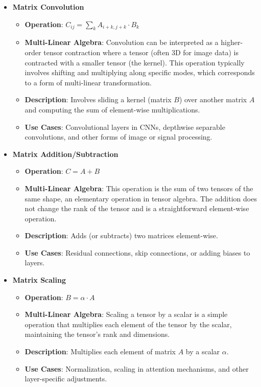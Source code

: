 \documentclass{article}
\begin{document}
\begin{itemize}
\item \textbf{Matrix Convolution}
    \begin{itemize}
        \item \textbf{Operation}: \( C_{ij} = \sum_k A_{i+k,j+k} \cdot B_k \)
        \item \textbf{Multi-Linear Algebra}: Convolution can be interpreted as a higher-order tensor contraction where a tensor (often 3D for image data) is contracted with a smaller tensor (the kernel). This operation typically involves shifting and multiplying along specific modes, which corresponds to a form of multi-linear transformation.
        \item \textbf{Description}: Involves sliding a kernel (matrix \(B\)) over another matrix \(A\) and computing the sum of element-wise multiplications.
        \item \textbf{Use Cases}: Convolutional layers in CNNs, depthwise separable convolutions, and other forms of image or signal processing.
    \end{itemize}

\item \textbf{Matrix Addition/Subtraction}
    \begin{itemize}
        \item \textbf{Operation}: \( C = A + B \)
        \item \textbf{Multi-Linear Algebra}: This operation is the sum of two tensors of the same shape, an elementary operation in tensor algebra. The addition does not change the rank of the tensor and is a straightforward element-wise operation.
        \item \textbf{Description}: Adds (or subtracts) two matrices element-wise.
        \item \textbf{Use Cases}: Residual connections, skip connections, or adding biases to layers.
    \end{itemize}

\item \textbf{Matrix Scaling}
    \begin{itemize}
        \item \textbf{Operation}: \( B = \alpha \cdot A \)
        \item \textbf{Multi-Linear Algebra}: Scaling a tensor by a scalar is a simple operation that multiplies each element of the tensor by the scalar, maintaining the tensor's rank and dimensions.
        \item \textbf{Description}: Multiplies each element of matrix \(A\) by a scalar \(\alpha\).
        \item \textbf{Use Cases}: Normalization, scaling in attention mechanisms, and other layer-specific adjustments.
    \end{itemize}


\end{itemize}
\end{document}
